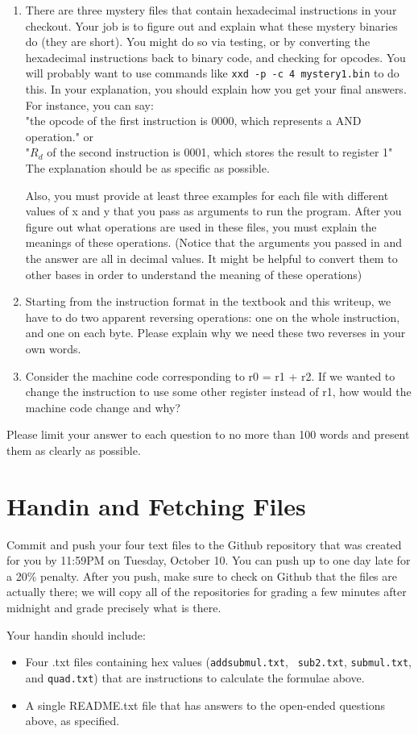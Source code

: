 \documentclass{article}
\begin{document}
\begin{enumerate} \item There are three mystery files that contain hexadecimal
instructions in your checkout. Your job is to figure out and explain what these
mystery binaries do (they are short). You might do so via testing, or by
converting the hexadecimal instructions back to binary code, and checking for
opcodes. You will probably want to use commands like {\tt xxd -p -c 4
mystery1.bin} to do this. In your explanation, you should explain how you get
your final answers. For instance, you can say:\\ "the opcode of the first
instruction is 0000, which represents a AND operation." or\\ "$R_d$ of the
second instruction is 0001, which stores the result to register 1"\\ The
explanation should be as specific as possible.
 
Also, you must provide
at least three examples for each file with different values of x and y that you pass as 
arguments to run the program. After you figure out what operations are used in these files,
you must explain the meanings of these operations. (Notice that the arguments you passed in
and the answer are all in decimal values. It might be helpful to convert them to other
bases in order to understand the meaning of these operations)

\item Starting from the instruction format in the textbook and this writeup, 
we have to do two apparent reversing operations: one on the whole instruction, 
and one on each byte. Please explain why we need these two reverses in your
own words.
\item Consider the machine code corresponding to r0 = r1 + r2. If we wanted to 
change the instruction to use some other register instead of r1, how would the 
machine code change and why?
\end{enumerate}

Please limit your answer to each question to no more than 100 words and present 
them as clearly as possible.

\section{Handin and Fetching Files}

Commit and push your four text files to the Github repository that was created
for you by 11:59PM on Tuesday, October 10. You can push up to one day late for
a 20\% penalty. After you push, make sure to check on Github that the files are
actually there; we will copy all of the repositories for grading a few minutes
after midnight and grade precisely what is there.

Your handin should include:

\begin{itemize}
\item Four .txt files containing hex values ({\tt addsubmul.txt}, {\tt
sub2.txt}, {\tt submul.txt}, and {\tt quad.txt}) that are instructions to
calculate the formulae above.
\item A single README.txt file that has answers to the open-ended questions
above, as specified.
\end{itemize}
\end{document}
